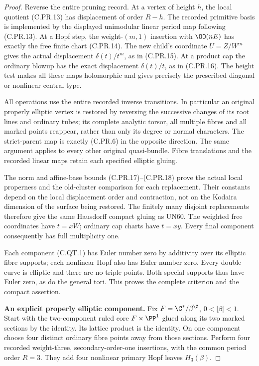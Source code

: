 \begin{proof}
Reverse the entire pruning record.
At a vertex of height $h$, the
local quotient (C.PR.13) has
displacement of order $R-h$.
The recorded primitive basis is
implemented by the displayed
unimodular linear period map
following (C.PR.13). At a Hopf
step, the weight-$(m,1)$ insertion
with $\OO(nE)$ has exactly the
free finite chart (C.PR.14).
The new child's coordinate
$U=Z/W^m$ gives the actual
displacement $\delta(t)/t^m$,
as in (C.PR.15). At a product
cap the ordinary blowup has
the exact displacement
$\delta(t)/t$, as in (C.PR.16).
The height test makes all these
maps holomorphic and gives
precisely the prescribed diagonal
or nonlinear central type.

All operations use the entire
recorded inverse transitions.
In particular an original
properly elliptic vertex is
restored by reversing the
successive changes of its
root lines and ordinary tubes;
its complete analytic torsor,
all multiple fibres and all
marked points reappear, rather
than only its degree or normal
characters. The strict-parent
map is exactly (C.PR.6) in the
opposite direction. The same
argument applies to every
other original quasi-bundle.
Fibre translations and the
recorded linear maps retain
each specified elliptic gluing.

The norm and affine-base bounds
(C.PR.17)--(C.PR.18) prove the
actual local properness and
the old-cluster comparison for
each replacement. Their constants
depend on the local displacement
order and contraction, not on the
Kodaira dimension of the surface
being restored. The finitely many
disjoint replacements therefore
give the same Hausdorff compact
gluing as UN60. The weighted
free coordinates have $t=xW$;
ordinary cap charts have $t=xy$.
Every final component consequently
has full multiplicity one.

Each component (C.QT.1) has Euler
number zero by additivity over
its elliptic fibre supports;
each nonlinear Hopf also has
Euler number zero. Every double
curve is elliptic and there are
no triple points. Both special
supports thus have Euler zero,
as do the general tori. This
proves the complete criterion
and the compact assertion.

\par\medskip\noindent\textbf{An explicit properly elliptic component.}
Fix $F=\C^*/\beta^{\Z}$, $0<|\beta|<1$.
Start with the two-component
ruled core $F\times\PP^1$
glued along its two marked
sections by the identity.
Its lattice product is the
identity. On one component
choose four distinct ordinary
fibre points away from those
sections. Perform four recorded
weight-three, secondary-order-one
insertions, with the common
period order $R=3$.
They add four nonlinear primary
Hopf leaves $H_3(\beta)$.


\end{proof}
